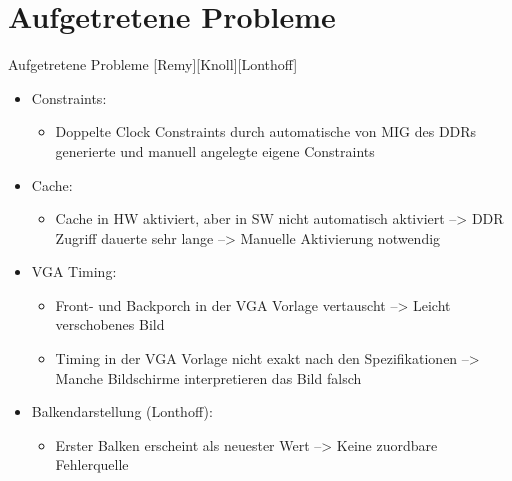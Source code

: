 \section*{Aufgetretene Probleme}
\begin{frame}{Aufgetretene Probleme [Remy][Knoll][Lonthoff]}
    \begin{itemize}
        \item Constraints:
        \begin{itemize}
            \item Doppelte Clock Constraints durch automatische von MIG des DDRs generierte und manuell angelegte eigene Constraints
        \end{itemize}
        \item Cache:
        \begin{itemize}
            \item Cache in HW aktiviert, aber in SW nicht automatisch aktiviert
            \newline
            --> DDR Zugriff dauerte sehr lange
            \newline
            --> Manuelle Aktivierung notwendig
        \end{itemize}
        \item VGA Timing:
        \begin{itemize}
            \item Front- und Backporch in der VGA Vorlage vertauscht
            \newline
            --> Leicht verschobenes Bild
            \item Timing in der VGA Vorlage nicht exakt nach den Spezifikationen
            \newline
            --> Manche Bildschirme interpretieren das Bild falsch
        \end{itemize}
        \item Balkendarstellung (Lonthoff):
        \begin{itemize}
            \item Erster Balken erscheint als neuester Wert
            \newline
            --> Keine zuordbare Fehlerquelle
        \end{itemize}
    \end{itemize}
\end{frame}